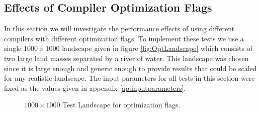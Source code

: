 \subsection{Effects of Compiler Optimization Flags}
\label{subsec:opflags}
In this section we will investigate the performance effects of using different compilers with different optimization flags. To implement these tests we use a single $1000\times1000$ landscape given in figure \ref{fig:OptLandscape} which consists of two large land masses separated by a river of water. This landscape was chosen since it is large enough and generic enough to provide results that could be scaled for any realistic landscape. The input parameters for all tests in this section were fixed as the values given in appendix \ref{ap:inputparameters}.
\begin{figure}
\centering
{}
\caption{ $1000\times1000$ Test Landscape for optimization flags.}
\label{fig:optlandscape}
\end{figure}

